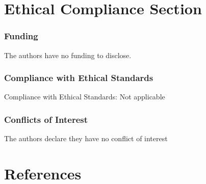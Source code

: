 \documentclass[
  man,floatsintext]{apa6}
\begin{document}
\section{Ethical Compliance Section}\label{ethical-compliance-section}

\subsubsection{Funding}\label{funding}

The authors have no funding to disclose.

\subsubsection{Compliance with Ethical Standards}\label{compliance-with-ethical-standards}

Compliance with Ethical Standards: Not applicable

\subsubsection{Conflicts of Interest}\label{conflicts-of-interest}

The authors declare they have no conflict of interest

\newpage

\section{References}\label{references}
\end{document}
